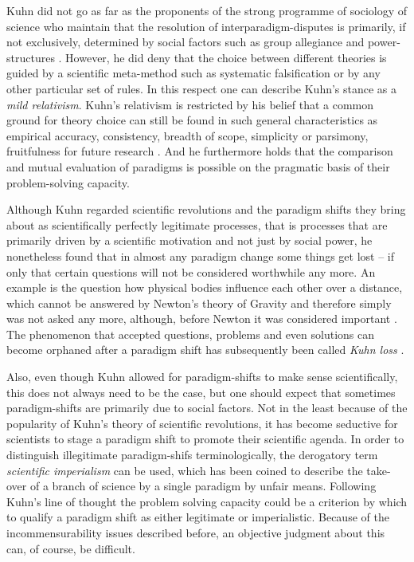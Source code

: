 \documentclass[12pt, a4paper]{article}
\begin{document}
Kuhn did not go as far as the proponents of the strong programme of
sociology of science who maintain that the resolution of
interparadigm-disputes is primarily, if not exclusively, determined by
social factors such as group allegiance and power-structures
\citep[sec. 6.3]{bird:2013}. However, he did deny that the choice
between different theories is guided by a scientific meta-method such
as systematic falsification or by any other particular set of rules.
In this respect one can describe Kuhn's stance as a {\em mild
relativism}.  Kuhn's relativism is restricted by his belief that a
common ground for theory choice can still be found in such general
characteristics as empirical accuracy, consistency, breadth of scope,
simplicity or parsimony, fruitfulness for future research \citep[ch.
13]{kuhn:1977}. And he furthermore holds that the comparison and
mutual evaluation of paradigms is possible on the pragmatic basis of
their problem-solving capacity.

Although Kuhn regarded scientific revolutions and the paradigm shifts
they bring about as scientifically perfectly legitimate processes,
that is processes that are primarily driven by a scientific motivation
and not just by social power, he nonetheless found that in almost any
paradigm change some things get lost -- if only that certain questions
will not be considered worthwhile any more. An example is the question
how physical bodies influence each other over a distance, which cannot
be answered by Newton's theory of Gravity and therefore simply was not
asked any more, although, before Newton it was considered important
\citep[ch. 12]{kuhn:1976}. The phenomenon that accepted questions,
problems and even solutions can become orphaned after a paradigm shift
has subsequently been called {\em Kuhn loss} \citep[sec.
2]{bird:2013}.

Also, even though Kuhn allowed for paradigm-shifts to make sense
scientifically, this does not always need to be the case, but one
should expect that sometimes paradigm-shifts are primarily due to
social factors. Not in the least because of the popularity of Kuhn's
theory of scientific revolutions, it has become seductive for
scientists to stage a paradigm shift to promote their scientific
agenda. In order to distinguish illegitimate paradigm-shifs
terminologically, the derogatory term {\em scientific imperialism} can
be used, which has been coined to describe the take-over of a branch
of science by a single paradigm \citep{dupre:1994} by unfair means.
Following Kuhn's line of thought the problem solving capacity could be
a criterion by which to qualify a paradigm shift as either legitimate
or imperialistic. Because of the incommensurability issues described
before, an objective judgment about this can, of course, be difficult.
\end{document}
